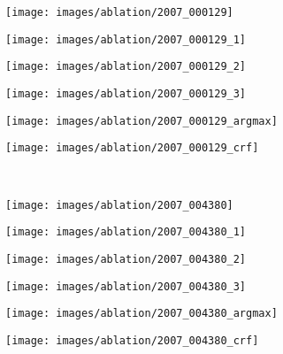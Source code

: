 \documentclass[runningheads]{styles/llncs}
\begin{document}
\begin{figure}[t]
\centering
\begin{subfigure}[t]{.15\linewidth}
\texttt{[image: images/ablation/2007\_000129]}
\end{subfigure}
\begin{subfigure}[t]{.15\linewidth}
\texttt{[image: images/ablation/2007\_000129\_1]}
\end{subfigure}
\begin{subfigure}[t]{.15\linewidth}
\texttt{[image: images/ablation/2007\_000129\_2]}
\end{subfigure}
\begin{subfigure}[t]{.15\linewidth}
\texttt{[image: images/ablation/2007\_000129\_3]}
\end{subfigure}
\begin{subfigure}[t]{.15\linewidth}
\texttt{[image: images/ablation/2007\_000129\_argmax]}
\end{subfigure}
\begin{subfigure}[t]{.15\linewidth}
\texttt{[image: images/ablation/2007\_000129\_crf]}
\end{subfigure}\\
\begin{subfigure}[t]{.15\linewidth}
\texttt{[image: images/ablation/2007\_004380]}
\end{subfigure}
\begin{subfigure}[t]{.15\linewidth}
\texttt{[image: images/ablation/2007\_004380\_1]}
\end{subfigure}
\begin{subfigure}[t]{.15\linewidth}
\texttt{[image: images/ablation/2007\_004380\_2]}
\end{subfigure}
\begin{subfigure}[t]{.15\linewidth}
\texttt{[image: images/ablation/2007\_004380\_3]}
\end{subfigure}
\begin{subfigure}[t]{.15\linewidth}
\texttt{[image: images/ablation/2007\_004380\_argmax]}
\end{subfigure}
\begin{subfigure}[t]{.15\linewidth}
\texttt{[image: images/ablation/2007\_004380\_crf]}
\end{subfigure}\\
\begin{subfigure}[t]{.15\linewidth}

\end{subfigure}
\end{figure}
\end{document}
